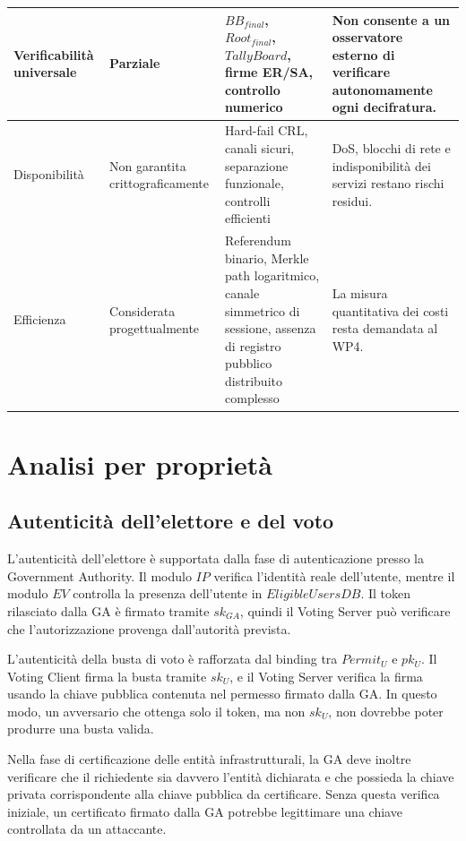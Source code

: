 \documentclass[a4paper,12pt]{article}
\begin{document}
\begin{longtable}{|>{\raggedright\arraybackslash}p{}|>{\raggedright\arraybackslash}p{}|>{\raggedright\arraybackslash}p{}|>{\raggedright\arraybackslash}p{}|}
    \hline
    Verificabilità universale & Parziale & \(BB_{final}\), \(Root_{final}\), \(TallyBoard\), firme ER/SA, controllo numerico & Non consente a un osservatore esterno di verificare autonomamente ogni decifratura. \\
    \hline
    Disponibilità & Non garantita crittograficamente & Hard-fail CRL, canali sicuri, separazione funzionale, controlli efficienti & DoS, blocchi di rete e indisponibilità dei servizi restano rischi residui. \\
    \hline
    Efficienza & Considerata progettualmente & Referendum binario, Merkle path logaritmico, canale simmetrico di sessione, assenza di registro pubblico distribuito complesso & La misura quantitativa dei costi resta demandata al WP4. \\
    \hline
\end{longtable}

\section{Analisi per proprietà}

\subsection{Autenticità dell'elettore e del voto}

L'autenticità dell'elettore è supportata dalla fase di autenticazione presso la Government Authority.
Il modulo \(IP\) verifica l'identità reale dell'utente, mentre il modulo \(EV\) controlla la presenza dell'utente in \(EligibleUsersDB\).
Il token rilasciato dalla GA è firmato tramite \(sk_{GA}\), quindi il Voting Server può verificare che l'autorizzazione provenga dall'autorità prevista.

L'autenticità della busta di voto è rafforzata dal binding tra \(Permit_U\) e \(pk_U\).
Il Voting Client firma la busta tramite \(sk_U\), e il Voting Server verifica la firma usando la chiave pubblica contenuta nel permesso firmato dalla GA.
In questo modo, un avversario che ottenga solo il token, ma non \(sk_U\), non dovrebbe poter produrre una busta valida.

Nella fase di certificazione delle entità infrastrutturali, la GA deve inoltre verificare che il richiedente sia davvero l'entità dichiarata e che possieda la chiave privata corrispondente alla chiave pubblica da certificare. Senza questa verifica iniziale, un certificato firmato dalla GA potrebbe legittimare una chiave controllata da un attaccante.
\end{document}
